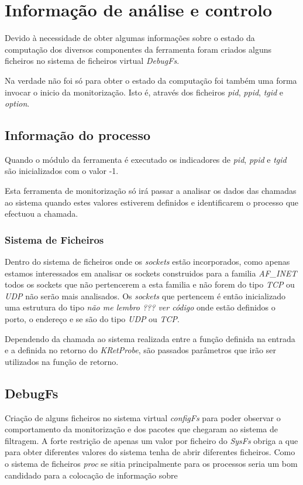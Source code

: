 \section{Informação de análise e controlo}

Devido à necessidade de obter algumas informações sobre o estado da computação dos diversos componentes da ferramenta foram criados alguns ficheiros no
sistema de ficheiros virtual \textit{DebugFs}.

Na verdade não foi só para obter o estado da computação foi também uma forma invocar o inicio da monitorização.
 Isto é, através dos ficheiros \textit{pid}, \textit{ppid}, \textit{tgid} e \textit{option}. 

\subsection{Informação do processo}

Quando o módulo da ferramenta é executado os indicadores de \textit{pid}, \textit{ppid} e \textit{tgid} são inicializados com o valor -1.

Esta ferramenta de monitorização só irá passar a analisar os dados das chamadas ao sistema quando estes valores estiverem definidos e identificarem o processo que efectuou a chamada.

\subsubsection{Sistema de Ficheiros}

Dentro do sistema de ficheiros onde os \textit{sockets} estão incorporados, como apenas estamos interessados em analisar os sockets construidos para a
familia \textit{AF\_INET} todos os sockets que não pertencerem a esta familia e não forem do tipo \textit{TCP} ou \textit{UDP} não serão mais analisados.
 Os \textit{sockets} que pertencem é então inicializado uma estrutura do tipo \textit{não me lembro ??? ver código} onde estão definidos o porto, o endereço
e se são do tipo \textit{UDP} ou \textit{TCP}.

Dependendo da chamada ao sistema realizada entre a função definida na entrada e a definida no retorno do \textit{KRetProbe}, são passados parâmetros que irão
ser utilizados na função de retorno.


\subsection{DebugFs}
Criação de alguns ficheiros no sistema virtual \textit{configFs} para poder observar o comportamento da monitorização e dos pacotes que chegaram ao sistema de filtragem.
A forte restrição de apenas um valor por ficheiro do \textit{SysFs} obriga a que para obter diferentes valores do sistema tenha de abrir diferentes ficheiros.
 Como o sistema de ficheiros \textit{proc} se sitia principalmente para os processos seria um bom candidado para a colocação de informação sobre 


